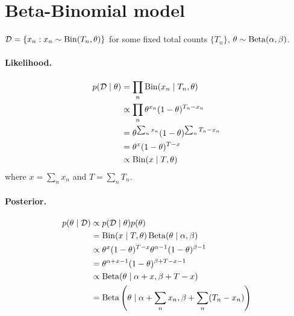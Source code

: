 \section{Beta-Binomial model}
$\mathcal D = \{x_n : x_n \sim \operatorname{Bin}(T_n, \theta)\}$ for some fixed total counts $\{T_n\}$, $\theta \sim \operatorname{Beta}(\alpha, \beta)$.

\paragraph{Likelihood.}
    \begin{align*}
        p(\mathcal D \mid \theta)   &= \prod_n \operatorname{Bin}(x_n \mid T_n, \theta) \\
                                    &\propto \prod_n \theta^{x_n} (1 - \theta)^{T_n - x_n} \\
                                    &= \theta^{\sum_n x_n} (1 - \theta)^{\sum_n T_n - x_n} \\
                                    &= \theta^{x} (1 - \theta)^{T - x} \\
                                    &\propto \operatorname{Bin}(x \mid T, \theta)
    \end{align*}
where $x = \sum_n x_n$ and $T = \sum_n T_n$.

\paragraph{Posterior.}
    \begin{align*}
        p(\theta \mid \mathcal D)   &\propto p(\mathcal D \mid \theta) p(\theta) \\
                                    &= \operatorname{Bin}(x \mid T, \theta) \operatorname{Beta}(\theta \mid \alpha, \beta) \\
                                    &\propto \theta^{x} (1 - \theta)^{T - x} \theta^{\alpha - 1} (1 - \theta)^{\beta - 1} \\
                                    &= \theta^{\alpha + x - 1} (1 - \theta)^{\beta + T - x - 1} \\
                                    &\propto \operatorname{Beta}(\theta \mid \alpha + x, \beta + T - x) \\
                                    &= \operatorname{Beta}\left(\theta \mid \alpha + \sum_n x_n, \beta + \sum_n (T_n - x_n)\right)
    \end{align*}

